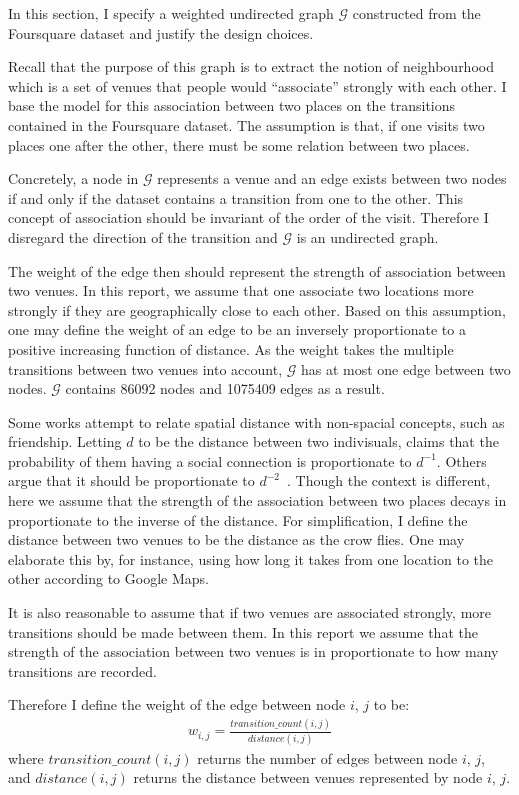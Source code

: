 In this section, I specify a weighted undirected graph $\mathcal{G}$ constructed from the Foursquare dataset and justify the design choices.

Recall that the purpose of this graph is to extract the notion of neighbourhood which is a set of venues that people would ``associate'' strongly with each other. I base the model for this association between two places on the transitions contained in the Foursquare dataset. The assumption is that, if one visits two places one after the other, there must be some relation between two places.

Concretely, a node in $\mathcal{G}$ represents a venue and an edge exists between two nodes if and only if the dataset contains a transition from one to the other. This concept of association should be invariant of the order of the visit. Therefore I disregard the direction of the transition and $\mathcal{G}$ is an undirected graph.

The weight of the edge then should represent the strength of association between two venues. In this report, we assume that one associate two locations more strongly if they are geographically close to each other. Based on this assumption, one may define the weight of an edge to be an inversely proportionate to a positive increasing function of distance. As the weight takes the multiple transitions between two venues into account, $\mathcal{G}$ has at most one edge between two nodes. $\mathcal{G}$ contains 86092 nodes and 1075409 edges as a result.

Some works attempt to relate spatial distance with non-spacial concepts, such as friendship. Letting $d$ to be the distance between two indivisuals, \cite{backstrom2010find} claims that the probability of them having a social connection is proportionate to $d^{-1}$. Others argue that it should be proportionate to $d^{-2}$~\citep{lambiotte2008geographical}. Though the context is different, here we assume that the strength of the association between two places decays in proportionate to the inverse of the distance.  For simplification, I define the distance between two venues to be the distance as the crow flies. One may elaborate this by, for instance, using how long it takes from one location to the other according to Google Maps.

It is also reasonable to assume that if two venues are associated strongly, more transitions should be made between them. In this report we assume that the strength of the association between two venues is in proportionate to how many transitions are recorded.

Therefore I define the weight of the edge between node $i$, $j$ to be:
\begin{align*}
w_{i, j} = \frac{transition\_count(i, j)}{distance(i, j)}
\end{align*}
where $transition\_count(i, j)$ returns the number of edges between node $i$, $j$, and $distance(i, j)$ returns the distance between venues represented by node $i$, $j$.
